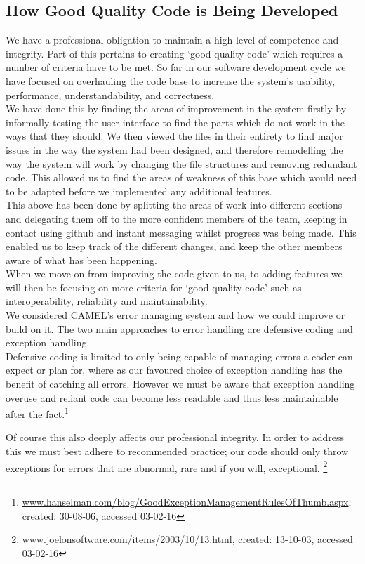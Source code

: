 \subsection*{How Good Quality Code is Being Developed}

We have a professional obligation to maintain a high level of competence and integrity. Part of this pertains to creating ‘good quality code’ which requires a number of criteria have to be met. So far in our software development cycle we have focused on overhauling the code base to increase the system's usability, performance, understandability, and correctness.\\

We have done this by finding the areas of improvement in the system firstly by informally testing the user interface to find the parts which do not work in the ways that they should. We then viewed the files in their entirety to find major issues in the way the system had been designed, and therefore remodelling the way the system will work by changing the file structures and removing redundant code. This allowed us to find the areas of weakness of this base which would need to be adapted before we implemented any additional features.\\

This above has been done by splitting the areas of work into different sections and delegating them off to the more confident members of the team, keeping in contact using github and instant messaging whilst progress was being made. This enabled us to keep track of the different changes, and keep the other members aware of what has been happening.\\

When we move on from improving the code given to us, to adding features we will then be focusing on more criteria for ‘good quality code’ such as interoperability, reliability and maintainability.\\

We considered CAMEL’s error managing system and how we could improve or build on it. The two main approaches to error handling are defensive coding  and exception handling.\\

Defensive coding is limited to only being capable of managing errors a coder can expect or plan for, where as our favoured choice of exception handling has the benefit of catching all errors. However we must be aware that exception handling overuse and reliant code can become less readable and thus less maintainable after the fact.\footnote{\url{ www.hanselman.com/blog/GoodExceptionManagementRulesOfThumb.aspx}, created: 30-08-06, accessed 03-02-16} 

Of course this also deeply affects our professional integrity. In order to address this we must best adhere to recommended practice; our code should only throw exceptions for errors that are abnormal, rare and if you will, exceptional. \footnote{\url{ www.joelonsoftware.com/items/2003/10/13.html}, created: 13-10-03, accessed 03-02-16}



